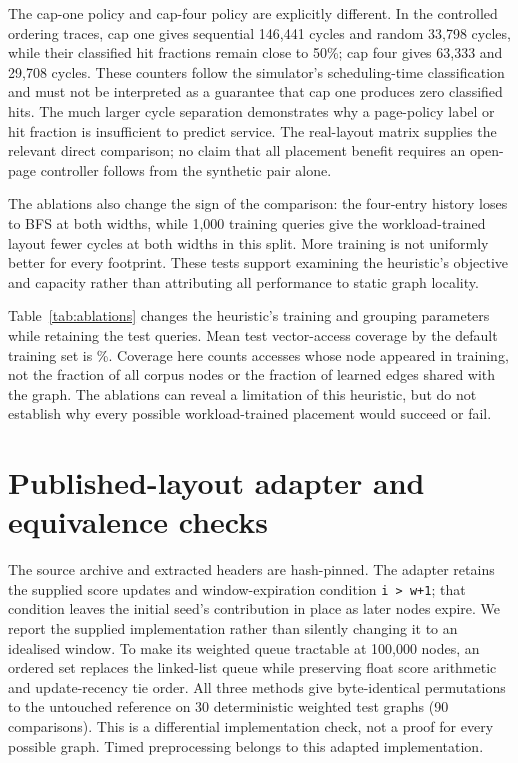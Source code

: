 The cap-one policy and cap-four policy are explicitly different. In the controlled ordering traces, cap one gives sequential 146,441 cycles and random 33,798 cycles, while their classified hit fractions remain close to 50\%; cap four gives 63,333 and 29,708 cycles. These counters follow the simulator's scheduling-time classification and must not be interpreted as a guarantee that cap one produces zero classified hits. The much larger cycle separation demonstrates why a page-policy label or hit fraction is insufficient to predict service. The real-layout matrix supplies the relevant direct comparison; no claim that all placement benefit requires an open-page controller follows from the synthetic pair alone.

The ablations also change the sign of the comparison: the four-entry history loses to BFS at both widths, while 1,000 training queries give the workload-trained layout fewer cycles at both widths in this split. More training is not uniformly better for every footprint. These tests support examining the heuristic's objective and capacity rather than attributing all performance to static graph locality.

Table~\ref{tab:ablations} changes the heuristic's training and grouping parameters while retaining the test queries. Mean test vector-access coverage by the default training set is \MeanCoverage\%. Coverage here counts accesses whose node appeared in training, not the fraction of all corpus nodes or the fraction of learned edges shared with the graph. The ablations can reveal a limitation of this heuristic, but do not establish why every possible workload-trained placement would succeed or fail.

\begin{table}[htbp]\centering\small\caption[Training and grouping ablations]{Split-one heuristic ablations. Coverage is the fraction of test vector accesses to a node seen in training; model time excludes search collection and layout construction.}\label{tab:ablations}
\end{table}


\section{Published-layout adapter and equivalence checks}
\label{app:adapters}
The source archive and extracted headers are hash-pinned. The adapter retains the supplied score updates and window-expiration condition \texttt{i > w+1}; that condition leaves the initial seed's contribution in place as later nodes expire. We report the supplied implementation rather than silently changing it to an idealised window. To make its weighted queue tractable at 100,000 nodes, an ordered set replaces the linked-list queue while preserving float score arithmetic and update-recency tie order. All three methods give byte-identical permutations to the untouched reference on 30 deterministic weighted test graphs (90 comparisons). This is a differential implementation check, not a proof for every possible graph. Timed preprocessing belongs to this adapted implementation.


